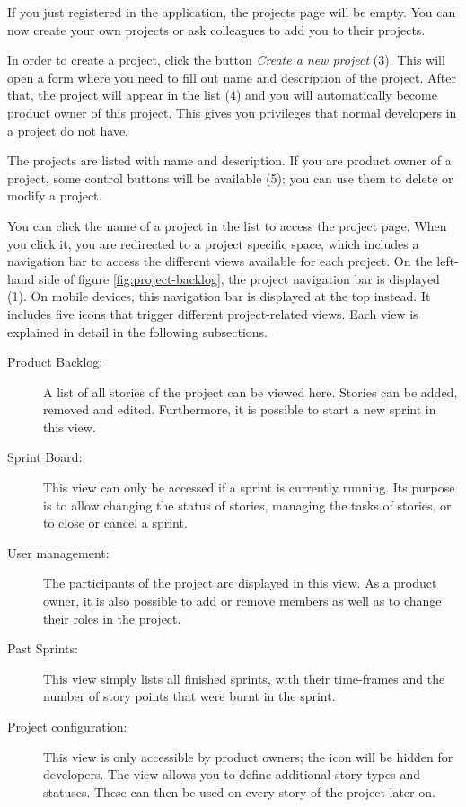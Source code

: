 \documentclass[
	accentcolor=tud1a %
]{tudreport}
\begin{document}
If you just registered in the application, the projects page will be empty. You can now create your own projects or ask colleagues to add you to their projects.

In order to create a project, click the button \emph{Create a new project} (3). This will open a form where you need to fill out name and description of the project. After that, the project will appear in the list (4) and you will automatically become product owner of this project. This gives you privileges that normal developers in a project do not have.

The projects are listed with name and description. If you are product owner of a project, some control buttons will be available (5); you can use them to delete or modify a project.

You can click the name of a project in the list to access the project page. When you click it, you are redirected to a project specific space, which includes a navigation bar to access the different views available for each project. On the left-hand side of figure \ref{fig:project-backlog}, the project navigation bar is displayed (1). On mobile devices, this navigation bar is displayed at the top instead. It includes five icons that trigger different project-related views. Each view is explained in detail in the following subsections.
\begin{description}
	\item[Product Backlog:] A list of all stories of the project can be viewed here. Stories can be added, removed and edited. Furthermore, it is possible to start a new sprint in this view.
	\item[Sprint Board:] This view can only be accessed if a sprint is currently running. Its purpose is to allow changing the status of stories, managing the tasks of stories, or to close or cancel a sprint.
	\item[User management:] The participants of the project are displayed in this view. As a product owner, it is also possible to add or remove members as well as to change their roles in the project.
	\item[Past Sprints:] This view simply lists all finished sprints, with their time-frames and the number of story points that were burnt in the sprint.
	\item[Project configuration:] This view is only accessible by product owners; the icon will be hidden for developers. The view allows you to define additional story types and statuses. These can then be used on every story of the project later on.
\end{description}
\end{document}

